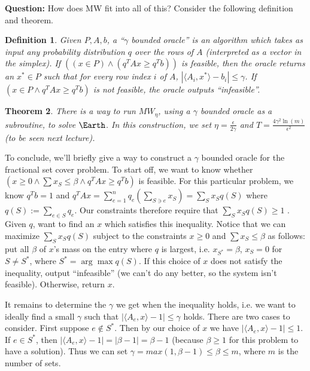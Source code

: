 \documentclass[11pt]{article}
\newtheorem{theorem}{Theorem}
\newtheorem{definition}[theorem]{Definition}
\begin{document}
\textbf{Question:} How does MW fit into all of this? Consider the following definition and theorem. 

\begin{definition} Given $P,A,b$, a ``$\gamma$ bounded oracle'' is an algorithm which takes as input any probability distribution $q$ over the rows of $A$ (interpreted as a vector in the simplex). If $((x \in P) \land (q^{T} A x \geq q^{T} b))$ is feasible, then the oracle returns an $x^{*} \in P$ such that for every row index $i$ of $A$, $|\langle A_i,x^{*} \rangle -b_i| \leq \gamma$. If $(x \in P \land q^{T} A x \geq q^{T} b)$ is not feasible, the oracle outputs ``infeasible''. 
\end{definition}

\begin{theorem} There is a way to run $MW_{\eta}$, using a $\gamma$ bounded oracle as a subroutine, to solve $\Earth$. In this construction, we set $\eta=\frac{\epsilon}{2\gamma}$ and $T=\frac{4\gamma^2 \ln(m)}{\epsilon^2 }$ (to be seen next lecture). 
\end{theorem}

To conclude, we'll briefly give a way to construct a $\gamma$ bounded oracle for the fractional set cover problem. To start off, we want to know whether $(x \geq 0 \land \sum x_{S} \leq \beta \land q^{T}A x \geq q^{T} b)$ is feasible. For this particular problem, we know $q^{T}b=1$ and $q^{T}A x=\sum_{e=1}^n q_{e}(\sum_{S \ni e} x_{S})=\sum_{S} x_{S} q(S)$ where $q(S) :=\sum_{e \in S} q_{e}$. Our constraints therefore require that  $\sum_{S} x_{S} q(S) \geq 1$ . Given $q$, want to find an $x$ which satisfies this inequality. Notice that we can maximize $\sum_{S} x_{S} q(S)$ subject to the constraints $x\ge 0$ and $\sum x_{S} \leq \beta$ as follows: put all $\beta$ of $x$'s mass on the entry where $q$ is largest, i.e. $x_{S^{*}}=\beta$, $x_{S}=0$ for $S \not = S^{*}$, where $S^{*}=\arg \max q(S)$. If this choice of $x$ does not satisfy the inequality, output ``infeasible'' (we can't do any better, so the system isn't feasible). Otherwise, return $x$. 

It remains to determine the $\gamma$ we get when the inequality holds, i.e. we want to ideally find a small $\gamma$ such that $|\langle A_{e},x \rangle-1| \leq \gamma$ holds. There are two cases to consider. First suppose $e \not \in S^*$. Then by our choice of $x$ we have $|\langle A_{e},x \rangle-1| \leq 1$. If $e \in S^*$, then $|\langle A_{e},x \rangle-1|=|\beta-1|=\beta-1$ (because $\beta \geq 1$ for this problem to have a solution). Thus we can set $\gamma=max(1,\beta-1) \leq \beta \leq m$, where $m$ is the number of sets.
\end{document}
